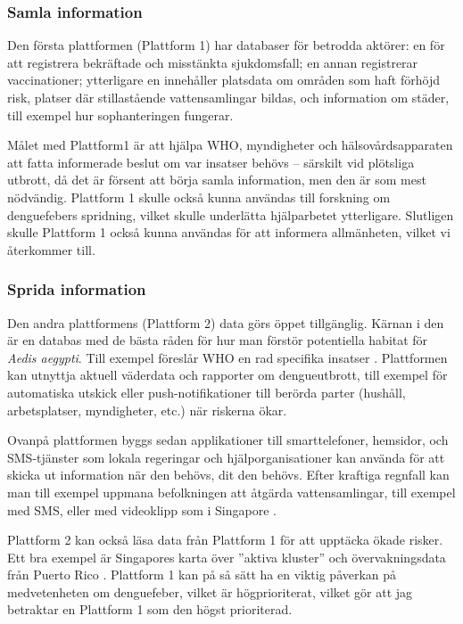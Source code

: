 \documentclass{article}
\begin{document}
\subsubsection{Samla information}

Den första plattformen (Plattform 1) har databaser för betrodda aktörer: en för att registrera bekräftade och misstänkta sjukdomsfall; en annan registrerar vaccinationer; ytterligare en innehåller platsdata om områden som haft förhöjd risk, platser där stillastående vattensamlingar bildas, och information om städer, till exempel hur sophanteringen fungerar. 

Målet med Plattform1 är att hjälpa WHO, myndigheter och hälsovårds\-apparaten att fatta informerade beslut om var insatser behövs – särskilt vid plötsliga utbrott, då det är försent att börja samla information, men den är som mest nödvändig. Plattform 1 skulle också kunna användas till forskning om denguefebers spridning, vilket skulle underlätta hjälparbetet ytterligare. Slutligen skulle Plattform 1 också kunna användas för att informera allmänheten, vilket vi återkommer till.

\subsubsection{Sprida information}

Den andra plattformens (Plattform 2) data görs öppet tillgänglig. Kärnan i den är en databas med de bästa råden för hur man förstör potentiella habitat för \emph{Aedis aegypti}. Till exempel föreslår WHO en rad specifika insatser . Plattformen kan utnyttja aktuell väderdata och rapporter om dengueutbrott, till exempel för automatiska utskick eller push-notifikationer till berörda parter (hushåll, arbetsplatser, myndigheter, etc.) när riskerna ökar.

Ovanpå plattformen byggs sedan applikationer till smarttelefoner, hemsidor, och SMS-tjänster som lokala regeringar och hjälporganisationer kan använda för att skicka ut information när den behövs, dit den behövs. Efter kraftiga regnfall kan man till exempel uppmana befolkningen att åtgärda vattensamlingar, till exempel med SMS, eller med videoklipp som i Singapore .
 
Plattform 2 kan också läsa data från Plattform 1 för att upptäcka ökade risker. Ett bra exempel är Singapores karta över ''aktiva kluster''  och övervakningsdata från Puerto Rico . Plattform 1 kan på så sätt ha en viktig påverkan på medvetenheten om denguefeber, vilket är högprioriterat, vilket gör att jag betraktar en Plattform 1 som den högst prioriterad.
\end{document}
